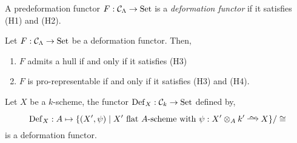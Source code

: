 \documentclass[12pt]{article}
\newcommand{\Set}{\mathrm{Set}}
\newcommand{\Def}{\mathrm{Def}}
\begin{document}
\begin{defn}
A predeformation functor $F : \C_{\Lambda} \to \Set$ is a \textit{deformation functor} if it satisfies (H1) and (H2).
\end{defn}

\begin{theorem}[Schlessinger]
Let $F : \C_{\Lambda} \to \Set$ be a deformation functor. Then,
\begin{enumerate}
\item $F$ admits a hull if and only if it satisfies (H3)
\item $F$ is pro-representable if and only if it satisfies (H3) and (H4).
\end{enumerate}
\end{theorem}

\begin{example}
Let $X$ be a $k$-scheme, the functor $\Def_X : \C_k \to \Set$ defined by,
\[ \Def_X : A \mapsto \{ (X', \psi) \mid X' \text{ flat } A\text{-scheme with } \psi : X' \ot_A k' \iso X \} / \cong \]
is a deformation functor. 
\end{example}
\end{document}
